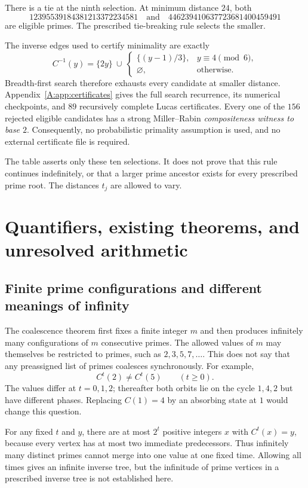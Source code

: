 \documentclass[11pt,a4paper]{article}
\theoremstyle{definition}
\theoremstyle{remark}
\numberwithin{equation}{section}
\begin{document}
There is a tie at the ninth selection. At minimum distance $24$, both
\[
12395539184381213372234581\quad\text{and}\quad
446239410637723681400459491
\]
are eligible primes. The prescribed tie-breaking rule selects the smaller.

The inverse edges used to certify minimality are exactly
\[
C^{-1}(y)=\{2y\}\ \cup\
\begin{cases}
\{(y-1)/3\},&y\equiv4\pmod6,\\
\varnothing,&\text{otherwise}.
\end{cases}
\]
Breadth-first search therefore exhausts every candidate at smaller distance.
Appendix~\ref{A:app:certificates} gives the full search recurrence, its numerical
checkpoints, and $89$ recursively complete Lucas certificates. Every one of
the $156$ rejected eligible candidates has a strong Miller--Rabin
\emph{compositeness witness to base $2$}. Consequently, no probabilistic
primality assumption is used, and no external certificate file is required.

The table asserts only these ten selections. It does not prove that this
rule continues indefinitely, or that a larger prime ancestor exists for
every prescribed prime root. The distances $t_j$ are allowed to vary.



\section{Quantifiers, existing theorems, and unresolved arithmetic}
\label{A:sec:limits}
\subsection{Finite prime configurations and different meanings of infinity}
The coalescence theorem first fixes a finite integer $m$ and then produces
infinitely many configurations of $m$ consecutive primes. The allowed values of
$m$ may themselves be restricted to primes, such as $2,3,5,7,\ldots$.
This does not say that any preassigned list of primes coalesces synchronously.
For example,
\[
C^t(2)\ne C^t(5)\qquad(t\ge0).
\]
The values differ at $t=0,1,2$; thereafter both orbits lie on the cycle
$1,4,2$ but have different phases. Replacing $C(1)=4$ by an absorbing state at
$1$ would change this question.

For any fixed $t$ and $y$, there are at most $2^t$ positive integers $x$ with
$C^t(x)=y$, because every vertex has at most two immediate predecessors.
Thus infinitely many distinct primes cannot merge into one value at one fixed
time. Allowing all times gives an infinite inverse tree, but the infinitude of
prime vertices in a prescribed inverse tree is not established here.
\end{document}
